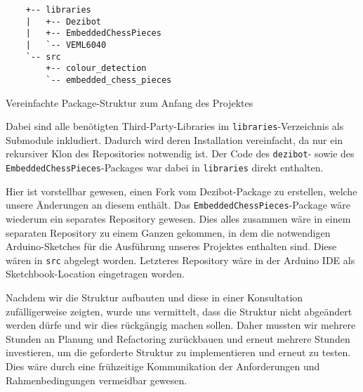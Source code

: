 \begin{listing}[h]
\begin{verbatim}
    +-- libraries
    |   +-- Dezibot
    |   +-- EmbeddedChessPieces
    |   `-- VEML6040
    `-- src
        +-- colour_detection
        `-- embedded_chess_pieces
\end{verbatim}
\caption{Vereinfachte Package-Struktur zum Anfang des Projektes}
\label{fig:project-structure}
\end{listing}

Dabei sind alle benötigten Third-Party-Libraries im \texttt{libraries}-Verzeichnis als Submodule inkludiert. Dadurch wird deren Installation vereinfacht, da nur ein rekursiver Klon des Repositories notwendig ist. Der Code des \texttt{dezibot}- sowie des \texttt{EmbeddedChessPieces}-Packages war dabei in \texttt{libraries} direkt enthalten.

Hier ist vorstellbar gewesen, einen Fork vom Dezibot-Package zu erstellen, welche unsere Änderungen an diesem enthält. Das \texttt{EmbeddedChessPieces}-Package wäre wiederum ein separates Repository gewesen. Dies alles zusammen wäre in einem separaten Repository zu einem Ganzen gekommen, in dem die notwendigen Arduino-Sketches für die Ausführung unseres Projektes enthalten sind. Diese wären in \texttt{src} abgelegt worden. Letzteres Repository wäre in der Arduino IDE als Sketchbook-Location eingetragen worden.

Nachdem wir die Struktur aufbauten und diese in einer Konsultation zu\-fäl\-liger\-weise zeigten, wurde uns vermittelt, dass die Struktur nicht abgeändert werden dürfe und wir dies rückgängig machen sollen. Daher mussten wir mehrere Stunden an Planung und Refactoring zurückbauen und erneut mehrere Stunden investieren, um die geforderte Struktur zu implementieren und erneut zu testen. Dies wäre durch eine frühzeitige Kommunikation der Anforderungen und Rahmenbedingungen vermeidbar gewesen.

